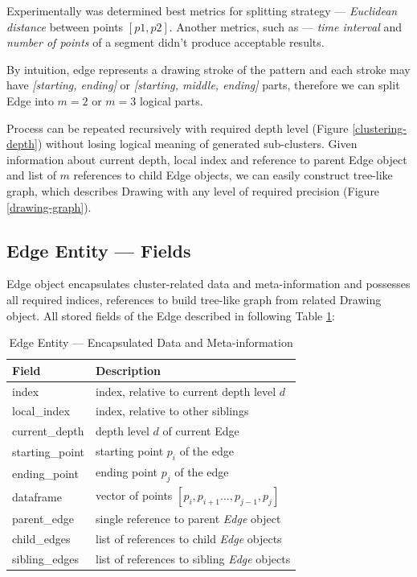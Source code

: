 Experimentally was determined best metrics for splitting strategy --- \textit{Euclidean distance} between points $[p1, p2]$. Another metrics, such as --- \textit{time interval} and \textit{number of points} of a segment didn't produce acceptable results.

By intuition, edge represents a drawing stroke of the pattern and each stroke may have \textit{[starting, ending] }or \textit{[starting, middle, ending]} parts, therefore we can split Edge into $m = 2$ or $m = 3$ logical parts.

Process can be repeated recursively with required depth level (Figure \ref{clustering-depth}) without losing logical meaning of generated sub-clusters. Given information about current depth, local index and reference to parent Edge object and list of $m$ references to child Edge objects, we can easily construct tree-like graph, which describes Drawing with any level of required precision (Figure \ref{drawing-graph}).

\subsection{Edge Entity --- Fields}
Edge object encapsulates cluster-related data and meta-information and possesses all required indices, references to build tree-like graph from related Drawing object. All stored fields of the Edge described in following Table \ref{edge-entity}:

\begin{table}[htb]
\centering
\begin{tabular}{p{} | p{}}
\hline
Field               &   Description \\
\hline
index             &   index, relative to current depth level $d$ \\
local\_index        &   index, relative to other siblings \\
current\_depth      &   depth level $d$ of current Edge \\
starting\_point     &   starting point $p_i$ of the edge \\
ending\_point       &   ending point $p_j$ of the edge \\
dataframe         &   vector of points $[p_i, p_{i+1} ..., p_{j-1}, p_j]$ \\
parent\_edge        &   single reference to parent \textit{Edge} object \\
child\_edges        &   list of references to child \textit{Edge} objects \\
sibling\_edges      &   list of references to sibling \textit{Edge} objects \\
\hline
\end{tabular}
\caption{Edge Entity --- Encapsulated Data and Meta-information}
\label{edge-entity}
\end{table}


